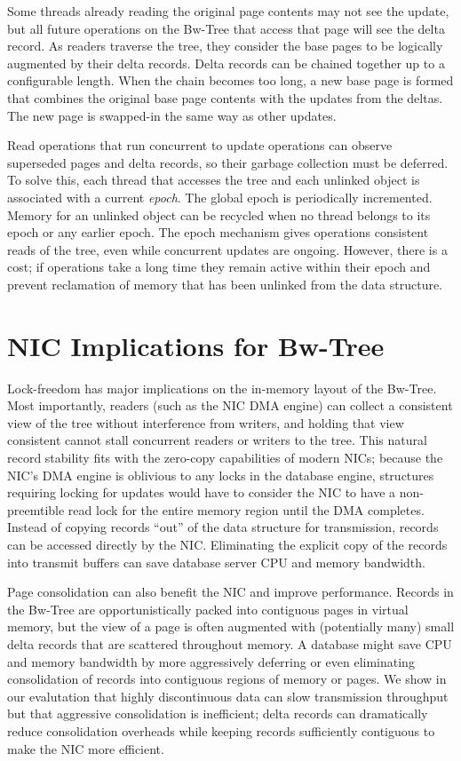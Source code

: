 Some threads already reading the original page contents may not see
the update, but all future operations on the Bw-Tree that access that page
will see the delta record. As readers traverse the tree, they consider
the base pages to be logically augmented by their delta records. Delta records
can be chained together up to a configurable length.  When the chain becomes
too long, a new base page is formed that combines the original base page
contents with the updates from the deltas. The new page is swapped-in
the same way as other updates.

Read operations that run concurrent to update operations can observe superseded
pages and delta records, so their garbage collection must be deferred.
To solve this, each thread that
accesses the tree and each unlinked object is associated with a current {\em epoch}.
The global epoch is periodically incremented. Memory for an unlinked object can be
recycled when no thread belongs to its epoch or any earlier epoch.
The epoch mechanism gives operations consistent reads of the
tree, even while concurrent updates are ongoing. However, there is a
cost; if operations take a long time they remain active within their epoch and
prevent reclamation of memory that has been unlinked from the data structure.


\section{NIC Implications for Bw-Tree}
Lock-freedom has major implications on the in-memory layout of the
Bw-Tree. Most importantly, readers (such as the NIC DMA engine) can collect a
consistent view of the tree without interference from writers, and holding that
view consistent cannot stall concurrent readers or writers to the tree.  This
natural record stability fits with the zero-copy capabilities of modern NICs;
because the NIC's DMA engine is oblivious to any locks in the database engine,
structures requiring locking for updates would have to consider the NIC to
have a non-preemtible read lock for the entire memory region until the DMA completes.
Instead of copying records ``out'' of the data structure for transmission,
records can be accessed directly by the NIC. Eliminating the explicit copy of
the records into transmit buffers can save database server CPU and memory
bandwidth.

Page consolidation can also benefit the NIC and improve performance.  Records
in the Bw-Tree are opportunistically packed into contiguous pages in virtual
memory, but the view of a page is often augmented with (potentially many)
small delta records that are scattered throughout memory.
A database might save CPU and memory bandwidth by more
aggressively deferring or even eliminating consolidation of records into
contiguous regions of memory or pages. We show in
our evalutation that highly discontinuous data can slow
transmission throughput but that aggressive consolidation is inefficient; delta
records can dramatically reduce consolidation overheads while keeping records
sufficiently contiguous to make the NIC more efficient.

